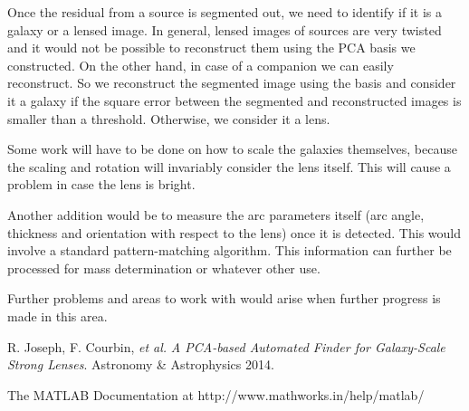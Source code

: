 \documentclass[11pt, a4paper]{article}
\begin{document}
Once the residual from a source is segmented out, we need to identify if it is a galaxy or a lensed image. In general, lensed images of sources are very twisted and it would not be possible to reconstruct them using the PCA basis we constructed. On the other hand, in case of a companion we can easily reconstruct. So we reconstruct the segmented image using the basis and consider it a galaxy if the square error between the segmented and reconstructed images is smaller than a threshold. Otherwise, we consider it a lens.

Some work will have to be done on how to scale the galaxies themselves, because the scaling and rotation will invariably consider the lens itself. This will cause a problem in case the lens is bright.

Another addition would be to measure the arc parameters itself (arc angle, thickness and orientation with respect to the lens) once it is detected. This would involve a standard pattern-matching algorithm. This information can further be processed for mass determination or whatever other use.

Further problems and areas to work with would arise when further progress is made in this area.

\begin{thebibliography}{9}

  R. Joseph, F. Courbin, \textit{et al.}
  \emph{A PCA-based Automated Finder for Galaxy-Scale Strong Lenses}.
  Astronomy \& Astrophysics
  2014.
  
  The MATLAB Documentation at http://www.mathworks.in/help/matlab/

\end{thebibliography}
\end{document}
